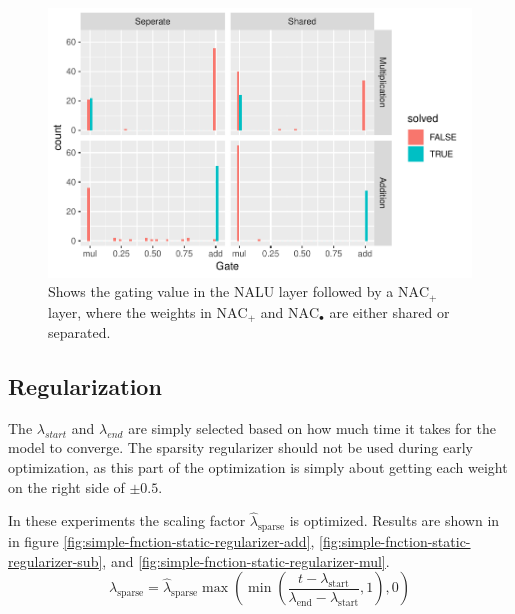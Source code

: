 \begin{figure}[h]
\centering
\includegraphics[scale=0.8]{results/function_task_static_nalu.pdf}
\caption{Shows the gating value in the NALU layer followed by a $\mathrm{NAC}_{+}$ layer, where the weights in $\mathrm{NAC}_{+}$ and $\mathrm{NAC}_{\bullet}$ are either shared or separated.}
\label{fig:simple-function-static-nalu-gate-graph}
\end{figure}



\subsection{Regularization}
\label{sec:appendix:simple-function-task:regualization}

The $\lambda_{start}$ and $\lambda_{end}$ are simply selected based on how much time it takes for the model to converge. The sparsity regularizer should not be used during early optimization, as this part of the optimization is simply about getting each weight on the right side of $\pm 0.5$.

In these experiments the scaling factor $\hat{\lambda}_{\mathrm{sparse}}$ is optimized. 
Results are shown in in figure \ref{fig:simple-fnction-static-regularizer-add}, \ref{fig:simple-fnction-static-regularizer-sub}, and \ref{fig:simple-fnction-static-regularizer-mul}.
\begin{equation}
\lambda_{\mathrm{sparse}} = \hat{\lambda}_{\mathrm{sparse}} \max(\min(\frac{t - \lambda_{\mathrm{start}}}{\lambda_{\mathrm{end}} - \lambda_{\mathrm{start}}}, 1), 0)
\end{equation}

